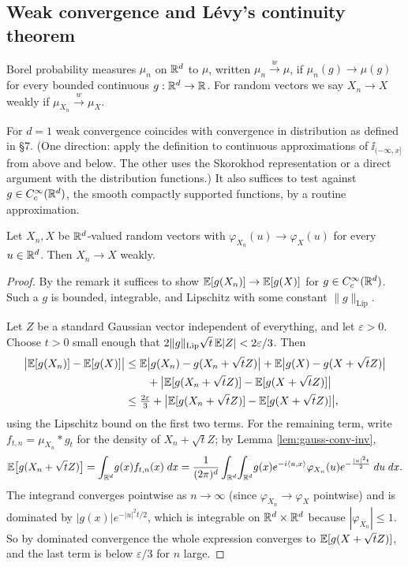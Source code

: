 \documentclass[a4paper]{scrartcl}
\newcommand{\ip}[2]{\langle #1, #2 \rangle}
\newcommand{\ind}{\ii}
\newcommand{\weakto}{\xrightarrow{\;w\;}}
\begin{document}
\subsection{Weak convergence and L\'evy's continuity theorem}

\begin{definition}
	Borel probability measures $\mu_n$ on $\mathbb{R}^d$  to $\mu$, written $\mu_n \weakto\mu$, if $\mu_n(g)\to\mu(g)$ for every bounded continuous $g : \mathbb{R}^d\to\mathbb{R}$. For random vectors we say $X_n \to X$ weakly if $\mu_{X_n}\weakto\mu_X$.
\end{definition}

\begin{remark}
	For $d=1$ weak convergence coincides with convergence in distribution as defined in \S7. (One direction: apply the definition to continuous approximations of $\ind_{(-\infty,x]}$ from above and below. The other uses the Skorokhod representation or a direct argument with the distribution functions.) It also suffices to test against $g \in C_c^\infty(\mathbb{R}^d)$, the smooth compactly supported functions, by a routine approximation.
\end{remark}

\begin{theorem}\label{thm:levy}
	Let $X_n, X$ be $\mathbb{R}^d$-valued random vectors with $\varphi_{X_n}(u)\to\varphi_X(u)$ for every $u \in\mathbb{R}^d$. Then $X_n \to X$ weakly.
\end{theorem}
\begin{proof}
	By the remark it suffices to show $\mathbb{E}[g(X_n)]\to\mathbb{E}[g(X)]$ for $g \in C_c^\infty(\mathbb{R}^d)$. Such a $g$ is bounded, integrable, and Lipschitz with some constant $\|g\|_{\mathrm{Lip}}$.

	Let $Z$ be a standard Gaussian vector independent of everything, and let $\varepsilon>0$. Choose $t>0$ small enough that $2\|g\|_{\mathrm{Lip}}\sqrt t\,\mathbb{E}|Z| < 2\varepsilon/3$. Then
	\begin{align*}
		\big|\mathbb{E}[g(X_n)]-\mathbb{E}[g(X)]\big| &\leq \mathbb{E}\big|g(X_n)-g(X_n+\sqrt tZ)\big| + \mathbb{E}\big|g(X)-g(X+\sqrt tZ)\big|\\
		&\qquad + \big|\mathbb{E}[g(X_n+\sqrt tZ)]-\mathbb{E}[g(X+\sqrt tZ)]\big|\\
		&\leq \tfrac{2\varepsilon}{3}+\big|\mathbb{E}[g(X_n+\sqrt tZ)]-\mathbb{E}[g(X+\sqrt tZ)]\big|,
	\end{align*}
	using the Lipschitz bound on the first two terms. For the remaining term, write $f_{t,n}=\mu_{X_n}*g_t$ for the density of $X_n+\sqrt tZ$; by Lemma \ref{lem:gauss-conv-inv},
	$$
	\EE\big[g(X_n+\sqrt tZ)\big]=\int_{\R^d}\!g(x)f_{t,n}(x)\dd x = \frac{1}{(2\pi)^d}\int_{\R^d}\!\int_{\R^d}\!g(x)e^{-i\ip{u}{x}}\varphi_{X_n}(u)e^{-\frac{|u|^2t}{2}}\dd u\dd x.
	$$
	The integrand converges pointwise as $n \to\infty$ (since $\varphi_{X_n}\to\varphi_X$ pointwise) and is dominated by $|g(x)|e^{-|u|^2t/2}$, which is integrable on $\mathbb{R}^d\times\mathbb{R}^d$ because $|\varphi_{X_n}|\leq1$. So by dominated convergence the whole expression converges to $\mathbb{E}[g(X+\sqrt tZ)]$, and the last term is below $\varepsilon/3$ for $n$ large.
\end{proof}
\end{document}
